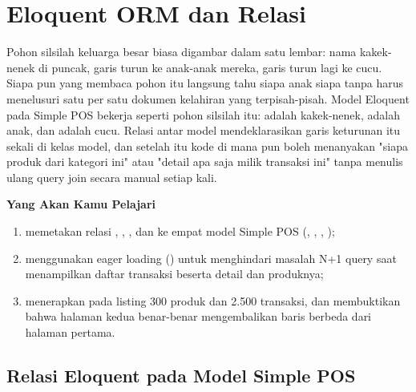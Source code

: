
\chapter{Eloquent ORM dan Relasi}
\label{ch:eloquent-dan-relasi}


Pohon silsilah keluarga besar biasa digambar dalam satu lembar: nama
kakek-nenek di puncak, garis turun ke anak-anak mereka, garis turun lagi
ke cucu. Siapa pun yang membaca pohon itu langsung tahu siapa anak
siapa tanpa harus menelusuri satu per satu dokumen kelahiran yang
terpisah-pisah. Model Eloquent pada Simple POS bekerja seperti pohon
silsilah itu:  adalah kakek-nenek, 
adalah anak,  dan 
adalah cucu. Relasi antar model mendeklarasikan garis keturunan itu
sekali di kelas model, dan setelah itu kode di mana pun boleh menanyakan
"siapa produk dari kategori ini" atau "detail apa saja milik transaksi
ini" tanpa menulis ulang query join secara manual setiap kali.

\textbf{Yang Akan Kamu Pelajari}

\begin{enumerate}
  \item memetakan relasi , , , dan  ke empat model Simple POS (, , , );
  \item menggunakan eager loading () untuk menghindari masalah N+1 query saat menampilkan daftar transaksi beserta detail dan produknya;
  \item menerapkan  pada listing 300 produk dan 2.500 transaksi, dan membuktikan bahwa halaman kedua benar-benar mengembalikan baris berbeda dari halaman pertama.
\end{enumerate}

\section{Relasi Eloquent pada Model Simple POS}
\label{sec:eloquent-dan-relasi-1}

